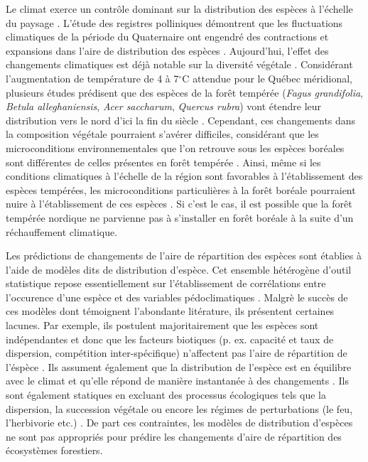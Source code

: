 Le climat exerce un contrôle dominant sur la distribution des espèces à l'échelle du paysage
\citep{Pearson2003b}. L'étude des registres polliniques démontrent que les fluctuations climatiques
de la période du Quaternaire ont engendré des contractions et expansions dans l'aire de distribution
des espèces \citep{Davis2001}. Aujourd'hui, l'effet des changements climatiques est déjà notable sur
la diversité végétale \citep{Walther2002a,Parmesan2006}. Considérant l'augmentation de température
de 4 à 7$^\circ$C \citep[Scénario RCP 8.5]{Climatique2015} attendue pour le Québec méridional,
plusieurs études prédisent que des espèces de la forêt tempérée (\textit{Fagus grandifolia},
\textit{Betula alleghaniensis}, \textit{Acer saccharum}, \textit{Quercus rubra}) vont étendre leur
distribution vers le nord d'ici la fin du siècle \citep{Iverson2002,Sciences2014}. Cependant, ces
changements dans la composition végétale pourraient s'avérer difficiles, considérant que les
microconditions environnementales que l’on retrouve sous les espèces boréales sont différentes de
celles présentes en forêt tempérée \citep{Barras1998,Caspersen2005}. Ainsi, même si les conditions
climatiques à l'échelle de la région sont favorables à l'établissement des espèces tempérées, les
microconditions particulières à la forêt boréale pourraient nuire à l'établissement de ces espèces \citep{DeFrenne2013,Lafleur2010}. Si c’est le cas, il est possible que la forêt tempérée
nordique ne parvienne pas à s'installer en forêt boréale à la suite d’un réchauffement climatique.

Les prédictions de changements de l'aire de répartition des espèces sont établies à l'aide de
modèles dits de distribution d'espèce. Cet ensemble hétérogène d'outil statistique repose
essentiellement sur l'établissement de corrélations entre l'occurence d'une espèce et des variables
pédoclimatiques \citep{Pearson2003b, Guisan2005a}. Malgrè le succès de ces modèles dont témoignent
l'abondante litérature, ils présentent certaines lacunes. Par exemple, ils postulent majoritairement
que les espèces sont indépendantes et donc que les facteurs biotiques (p. ex. capacité et taux de
dispersion, compétition inter-spécifique) n'affectent pas l'aire de répartition de l'éspèce
\citep{Guisan2005a,Pearson2003b}. Ils assument également que la distribution de l'espèce est en
équilibre avec le climat et qu'elle répond de manière instantanée à des changements
\citep{Austin2002}. Ils sont également statiques en excluant des processus écologiques tels que la
dispersion, la succession végétale ou encore les régimes de perturbations (le feu, l'herbivorie
etc.) \citep{Austin2002,Guisan2005a}. De part ces contraintes, les modèles de distribution d'espèces
ne sont pas appropriés pour prédire les changements d'aire de répartition des écosystèmes
forestiers.

